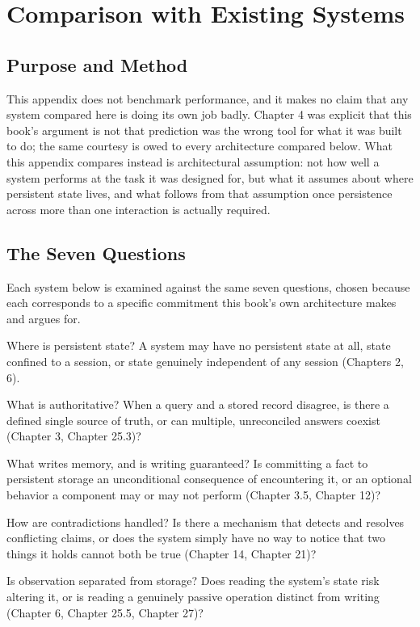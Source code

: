 \chapter{Comparison with Existing Systems}

\section{Purpose and Method}

This appendix does not benchmark performance, and it makes no claim that any system compared here is doing its own job badly. Chapter 4 was explicit that this book's argument is not that prediction was the wrong tool for what it was built to do; the same courtesy is owed to every architecture compared below. What this appendix compares instead is architectural assumption: not how well a system performs at the task it was designed for, but what it assumes about where persistent state lives, and what follows from that assumption once persistence across more than one interaction is actually required.

\section{The Seven Questions}

Each system below is examined against the same seven questions, chosen because each corresponds to a specific commitment this book's own architecture makes and argues for.

Where is persistent state? A system may have no persistent state at all, state confined to a session, or state genuinely independent of any session (Chapters 2, 6).

What is authoritative? When a query and a stored record disagree, is there a defined single source of truth, or can multiple, unreconciled answers coexist (Chapter 3, Chapter 25.3)?

What writes memory, and is writing guaranteed? Is committing a fact to persistent storage an unconditional consequence of encountering it, or an optional behavior a component may or may not perform (Chapter 3.5, Chapter 12)?

How are contradictions handled? Is there a mechanism that detects and resolves conflicting claims, or does the system simply have no way to notice that two things it holds cannot both be true (Chapter 14, Chapter 21)?

Is observation separated from storage? Does reading the system's state risk altering it, or is reading a genuinely passive operation distinct from writing (Chapter 6, Chapter 25.5, Chapter 27)?

